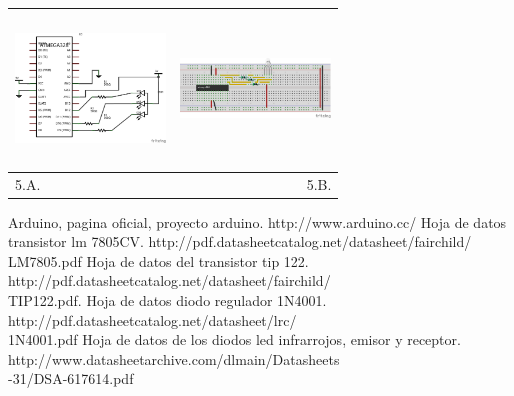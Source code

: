 \documentclass[12]{article}
\newenvironment{Figure}
{\par\medskip\noindent\minipage{\linewidth}}
{\endminipage\par\medskip}
\begin{document}
\begin{multicols}{2}
\begin{Figure}
\center
\begin{tabular}{|l|r|}
\hline
\includegraphics[width=4cm, height=4cm]{img/rgbesq.png} & \includegraphics[width=4cm, height=4cm]{img/rgbmont.png} \\ \hline
5.A. & 5.B. \\ \hline
\end{tabular}
\label{fig:g3}
\end{Figure}



\begin{thebibliography}{99}
 Arduino, pagina oficial, proyecto arduino. http://www.arduino.cc/
 Hoja de datos  transistor lm 7805CV. http://pdf.datasheetcatalog.net/datasheet/fairchild/\\LM7805.pdf
 Hoja de datos del transistor tip 122. http://pdf.datasheetcatalog.net/datasheet/fairchild/\\TIP122.pdf.
  Hoja de datos diodo regulador 1N4001. http://pdf.datasheetcatalog.net/datasheet/lrc/\\1N4001.pdf
 Hoja de datos de los diodos led infrarrojos, emisor y receptor. \\ http://www.datasheetarchive.com/dlmain/Datasheets\\-31/DSA-617614.pdf
\end{thebibliography}
\end{multicols}
\end{document}
